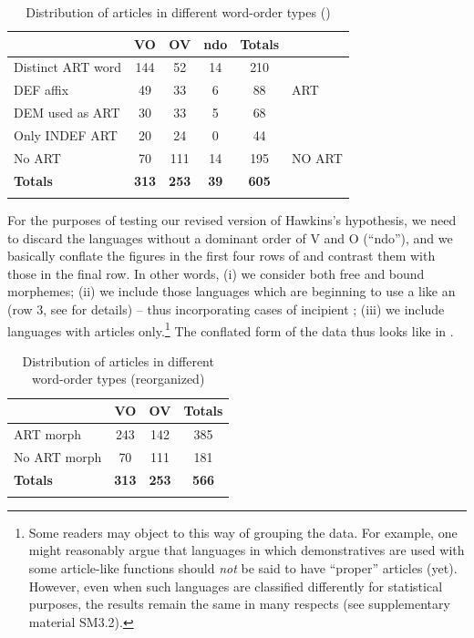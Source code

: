 \documentclass[output=paper]{langsci/langscibook}
\begin{document}
\begin{table}
\begin{tabularx}{.8\textwidth}{lSSSSl}
\lsptoprule
& VO &  OV &  ndo &  Totals\\
\midrule
Distinct ART word & 144 & 52 & 14 & 210 & \\
DEF affix & 49 & 33 & 6 & 88 & ART\\
DEM used as ART & 30 & 33 & 5 & 68 & \\
Only INDEF ART & 20 & 24 & 0 & 44 & \\
\midrule
No ART & 70 & 111 & 14 & 195 & NO ART\\
\midrule
\textbf{Totals} & \textbf{313} & \textbf{253} & \textbf{39} & \textbf{605} & \\
\lspbottomrule
\end{tabularx}
\caption{Distribution of articles in different word-order types (\citealt{Dryer2013_Def,Dryer2013_OV})}
\label{tab:ksb:1}
\end{table} 

For the purposes of testing our revised version of Hawkins’s hypothesis, we need to discard the languages without a dominant order of V and O (“ndo”), and we basically conflate the figures in the first four rows of  and contrast them with those in the final row. In other words, (i) we consider both free and bound  morphemes; (ii) we include those languages which are beginning to use a  like an  (row 3, see \citealt{Dryer2013_Def} for details) – thus incorporating cases of incipient ; (iii) we include languages with  articles only.\footnote{Some readers may object to this way of grouping the data. For example, one might reasonably argue that languages in which demonstratives are used with some article-like functions should \textit{not} be said to have “proper” articles (yet). However, even when such languages are classified differently for statistical purposes, the results remain the same in many respects (see supplementary material SM3.2).} The conflated form of the data thus looks like in .

\begin{table} 

\begin{tabularx}{.8\textwidth}{lSSS}
\lsptoprule
& VO  & OV & Totals\\
\midrule
ART morph & 243 & 142 & 385\\
No ART morph & 70 & 111 & 181\\
\midrule 
\textbf{Totals} & \textbf{313} & \textbf{253} & \textbf{566}\\
\lspbottomrule
\end{tabularx} 
\caption{Distribution of articles in different word-order types (reorganized)}
\label{tab:ksb:2}
\end{table} 
\end{document}
